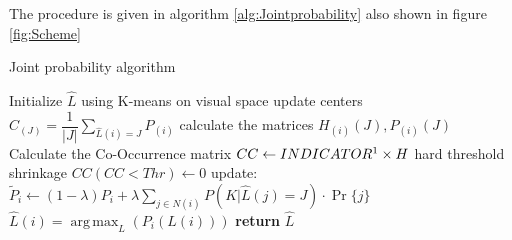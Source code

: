 \documentclass{article}
\DeclareMathOperator*{\argmax}{arg\,max}
\begin{document}
The procedure is given in algorithm \eqref{alg:Jointprobability} also shown in figure \ref{fig:Scheme}
\newpage

\begin{algorithm}[!h] 
	\caption{Joint probability algorithm}\label{alg:Jointprobability}
	\begin{algorithmic}
		\State Initialize $\hat L$ using K-means on visual space
		\Loop
		\State update centers $C_{(J)}=\dfrac{1}{|J|} \sum_{\hat{L}(i)=J}^{}P_{(i)}$
		\State calculate the matrices $ H_{(i)}(J),P_{(i)}(J) $
		\State Calculate the Co-Occurrence matrix  $ CC\gets INDICATOR\footnotemark\times H $
		\State hard threshold shrinkage $ CC(CC<Thr)\gets 0 $ 
		\State update: $ \widetilde{P}_i \leftarrow (1-\lambda)P_i + \lambda\sum_{j\in N(i)}^{} P(K|\hat{L}(j)=J)\cdot \Pr\{j\} $
		\State $ \hat{L}(i)=\argmax _L(  P_i(L(i))  ) $
		\EndLoop
		\State \textbf{return} $\hat{L}$
		
	\end{algorithmic}
\end{algorithm}
\end{document}
